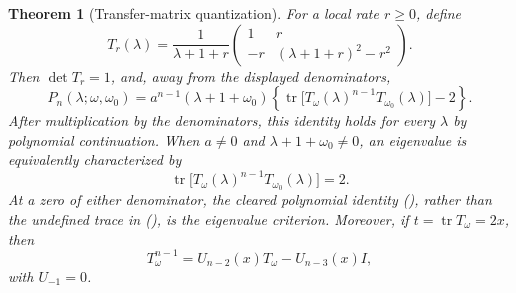 \documentclass[twoside,10pt]{article}
\numberwithin{equation}{section}
\theoremstyle{slbody}
\newtheorem{theorem}{Theorem}[section]
\theoremstyle{definition}
\theoremstyle{remark}
\renewcommand{\eqref}[1]{%
  \textup{{\normalfont(\oldstylenums{\ref{#1}}}\normalfont)}}
\begin{document}
\begin{theorem}[Transfer-matrix quantization]\label{thm:transfer}
For a local rate $r\geq0$, define
\begin{equation}
 T_r(\lambda)=\frac1{\lambda+1+r}
 \begin{pmatrix}
  1&r\\
  -r&(\lambda+1+r)^2-r^2
 \end{pmatrix}.
 \label{eq:transfer}
\end{equation}
Then $\det T_r=1$, and, away from the displayed denominators,
\begin{equation}
 P_n(\lambda;\omega,\omega_0)
 =a^{n-1}(\lambda+1+\omega_0)
   \left\{\operatorname{tr}
     \bigl[T_\omega(\lambda)^{n-1}T_{\omega_0}(\lambda)\bigr]-2\right\}.
 \label{eq:transfer-char}
\end{equation}
After multiplication by the denominators, this identity holds for every
$\lambda$ by polynomial continuation.  When $a\ne0$ and
$\lambda+1+\omega_0\ne0$, an eigenvalue is equivalently characterized by
\begin{equation}
 \operatorname{tr}
     \bigl[T_\omega(\lambda)^{n-1}T_{\omega_0}(\lambda)\bigr]=2.
 \label{eq:trace-two}
\end{equation}
At a zero of either denominator, the cleared polynomial identity
\eqref{eq:transfer-char}, rather than the undefined trace in
\eqref{eq:trace-two}, is the eigenvalue criterion.
Moreover, if $t=\operatorname{tr}T_\omega=2x$, then
\begin{equation}
 T_\omega^{n-1}=U_{n-2}(x)T_\omega-U_{n-3}(x)I,
 \label{eq:transfer-cheb}
\end{equation}
with $U_{-1}=0$.
\end{theorem}
\end{document}
